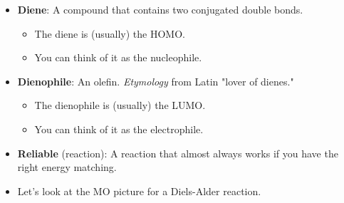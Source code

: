\documentclass[../notes.tex]{subfiles}
\begin{document}
\begin{itemize}
\begin{itemize}
        \item The simplest Diels-Alder (DA) reaction is drawn in Figure \ref{fig:dielsAlder}.
        \begin{itemize}
            \item This is actually a terrible Diels-Alder reaction because there's a poor HOMO-LUMO energy match (we'll talk more about what that means shortly).
        \end{itemize}
        \item The Diels-Alder is a powerful tool to make six-membered rings.
        \begin{itemize}
            \item We see a lot of six-membered rings in organic chemistry, so the Diels-Alder is very useful.
        \end{itemize}
        \item This reaction is very predictible: It is \textbf{regioselective}, \textbf{stereospecific}, and \textbf{reliable}.\footnote{We'll discuss both regioselectivity and stereospecificity later this lecture, and stereospecificity even further on Monday.}
    \end{itemize}
    \item \textbf{Diene}: A compound that contains two conjugated double bonds.
    \begin{itemize}
        \item The diene is (usually) the HOMO.
        \item You can think of it as the nucleophile.
    \end{itemize}
    \item \textbf{Dienophile}: An olefin. \emph{Etymology} from Latin "lover of dienes."
    \begin{itemize}
        \item The dienophile is (usually) the LUMO.
        \item You can think of it as the electrophile.
    \end{itemize}
    \item \textbf{Reliable} (reaction): A reaction that almost always works if you have the right energy matching.
    \item Let's look at the MO picture for a Diels-Alder reaction.
    \begin{figure}[H]
        \centering
\end{figure}
\end{itemize}
\end{document}
